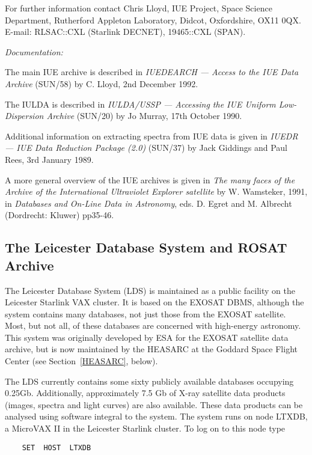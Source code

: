 \documentclass[twoside,11pt]{article}
\newcommand{\xref}[3]{#1}
\newcommand{\xlabel}[1]{}
\begin{document}
For further information contact Chris Lloyd, IUE Project, Space Science
Department, Rutherford Appleton Laboratory, Didcot, Oxfordshire, OX11
0QX. E-mail: RLSAC::CXL (Starlink DECNET), 19465::CXL (SPAN).

{\it Documentation:}

The main IUE archive is described in {\it IUEDEARCH --- Access to the
IUE Data Archive}
(\xref{SUN/58}{sun58}{}) by C. Lloyd, 2nd December 1992.

The IULDA is described in {\it IULDA/USSP --- Accessing the IUE Uniform
Low-Dispersion Archive} (\xref{SUN/20}{sun20}{}) by Jo Murray,
17th October 1990.

Additional information on extracting spectra from IUE data is given in
{\it IUEDR --- IUE Data Reduction Package (2.0)}
(\xref{SUN/37}{sun37}{}) by Jack
Giddings and Paul Rees, 3rd January 1989.

A more general overview of the IUE archives is given in {\it The many
faces of the Archive of the International Ultraviolet Explorer
satellite} by W. Wamsteker, 1991, in {\it Databases and On-Line Data
in Astronomy}, eds. D. Egret and M. Albrecht (Dordrecht: Kluwer)
pp35-46.

\subsection{The Leicester Database System and ROSAT Archive
\xlabel{the_leicester_database_system_and_rosat_archive}\label{LEICS}}

The Leicester Database System (LDS) is maintained as a public facility
on the Leicester Starlink VAX cluster. It is based on the EXOSAT DBMS,
although the system contains many databases, not just those from the
EXOSAT satellite. Most, but not all, of these databases are concerned
with high-energy astronomy. This system was originally developed by ESA
for the EXOSAT satellite data archive, but is now maintained by the
HEASARC at the Goddard Space Flight Center (see Section~\ref{HEASARC},
below).

The LDS currently contains some sixty publicly available databases
occupying 0.25Gb. Additionally, approximately 7.5 Gb of X-ray satellite
data products (images, spectra and light curves) are also available.
These data products can be analysed using software integral to the
system. The system runs on node LTXDB, a MicroVAX II in the Leicester
Starlink cluster. To log on to this node type

\begin{verbatim}
    SET  HOST  LTXDB
\end{verbatim}
\end{document}
